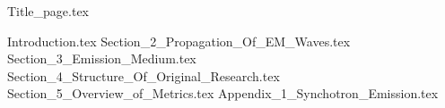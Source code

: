 \documentclass[a4paper,11pt]{article}
\numberwithin{equation}{section}
\numberwithin{figure}{section}
\begin{document}
\lfoot{}
{Title_page.tex}
\lfoot{}
\tableofcontents
\listoffigures
\newpage
\lfoot{}
{Introduction.tex}
\newpage
\lfoot{}
{Section_2_Propagation_Of_EM_Waves.tex}
\newpage
\lfoot{}
{Section_3_Emission_Medium.tex}
\newpage
\lfoot{}
{Section_4_Structure_Of_Original_Research.tex}
\newpage
\lfoot{}
{Section_5_Overview_of_Metrics.tex}
\newpage
\lfoot{}
\newpage
{Appendix_1_Synchotron_Emission.tex}
\lfoot{}
\end{document}
